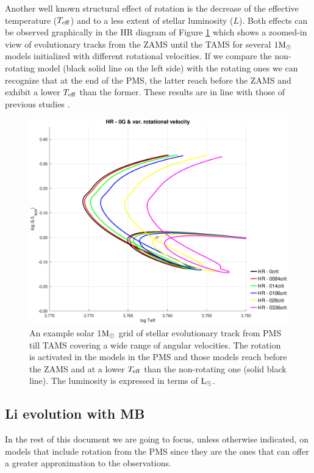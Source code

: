 \documentclass[fleqn,usenatbib]{mnras}
\begin{document}
Another well known structural effect of rotation is the decrease of the effective temperature ($T_{\mathrm{eff}}$) and to a less extent of stellar luminosity ($L$). Both effects can be observed graphically in the HR diagram of Figure \ref{fig:hr_var_vel_0g} which shows a zoomed-in view of evolutionary tracks from the ZAMS until the TAMS for several $1\mathrm{M}_\odot$ models initialized with different rotational velocities. If we compare the non-rotating model (black solid line on the left side) with the rotating ones we can recognize that at the end of the PMS, the latter reach before the ZAMS and exhibit a lower $T_{\mathrm{eff}}$ than the former. These results are in line with those of previous studies \citep[see e.g. ][]{Eggenberger2012,Piau2001,Pinsonneault1989}.\par


\begin{figure}
	\includegraphics[trim = 30mm 15mm 20mm 15mm, clip,width=\columnwidth]{figures/hr_var_vel_0_0g_z1.eps}
    \caption{An example solar 1$\mathrm{M}_\odot$ grid of stellar evolutionary track from PMS till TAMS covering a wide range of angular velocities. The rotation is activated in the models in the PMS and those models reach before the ZAMS and at a lower $T_{\mathrm{eff}}$ than the non-rotating one (solid black line). The luminosity is expressed in terms of $\mathrm{L}_\odot$.}
    \label{fig:hr_var_vel_0g}
\end{figure}

\subsection{Li evolution with MB}
In the rest of this document we are going to focus, unless otherwise indicated, on models that include rotation from the PMS since they are the ones that can offer a greater approximation to the observations.\par
\end{document}
